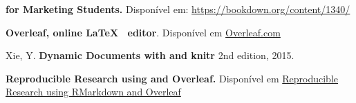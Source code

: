 \documentclass{article}
\begin{document}
\newpage

\begin{thebibliography}{99}
 \textbf{\faRProject for Marketing Students.} Disponível em: \href{https://bookdown.org/content/1340/}{https://bookdown.org/content/1340/} 

 \textbf{Overleaf, online \LaTeX~ editor}. Disponível em \href{http://www.overleaf.com}{Overleaf.com} 

 Xie, Y. \textbf{Dynamic Documents with \faRProject and knitr} 2nd edition, 2015.

 \textbf{Reproducible Research using \faRMarkdown and Overleaf.} Disponível em \href{https://static1.squarespace.com/static/5757268f7da24f26ca7b21d2/t/5c7587114192021796d7cc84/1551206162093/R_Overleaf_Integration.pdf}{Reproducible Research using RMarkdown and Overleaf}
\end{thebibliography}










\end{document}
